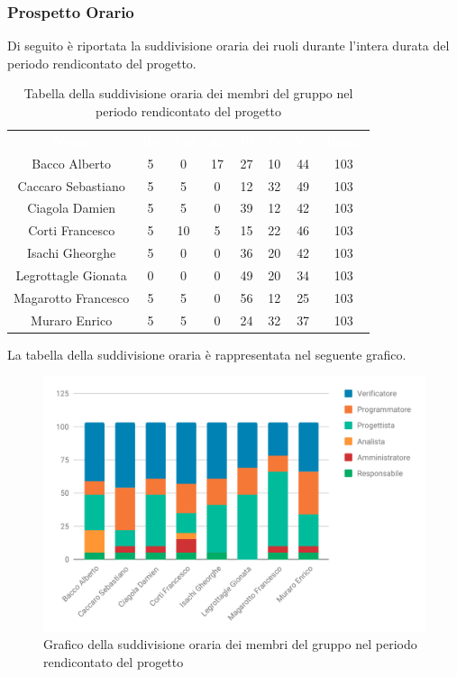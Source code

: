 \subsubsection{Prospetto Orario}
Di seguito è riportata la suddivisione oraria dei ruoli durante l'intera durata del periodo rendicontato del progetto.


\begin{table}[H]	
	\begin{center}
	    \begin{tabular}{cccccccc}
			\rowcolor{greySWEight}
			\textcolor{white}{\textbf{Nome}} & \textcolor{white}{\textbf{Re}} & \textcolor{white}{\textbf{Am}} & \textcolor{white}{\textbf{An}} & \textcolor{white}{\textbf{Pj}} & \textcolor{white}{\textbf{Pr}} & \textcolor{white}{\textbf{Ve}} & \textcolor{white}{\textbf{Totale}}
			\\			
			Bacco Alberto & 5 & 0 & 17 & 27 & 10 & 44 & 103 \\
			Caccaro Sebastiano & 5 & 5 & 0 & 12 & 32 & 49 & 103 \\
			Ciagola Damien & 5 & 5 & 0 & 39 & 12 & 42 & 103 \\
			Corti Francesco & 5 & 10 & 5 & 15 & 22 & 46 & 103 \\
			Isachi Gheorghe & 5 & 0 & 0 & 36 & 20 & 42 & 103 \\
			Legrottagle Gionata & 0 & 0 & 0 & 49 & 20 & 34 & 103 \\
			Magarotto Francesco & 5 & 5 & 0 & 56 & 12 & 25 & 103 \\
			Muraro Enrico & 5 & 5 & 0 & 24 & 32 & 37 & 103 \\
			\end{tabular}
	    \caption{Tabella della suddivisione oraria dei membri del gruppo nel periodo rendicontato del progetto} \label{tab:tabellaPersoneTotale} 
	\end{center}
\end{table}

La tabella della suddivisione oraria è rappresentata nel seguente grafico.
\begin{figure}[H]
	\includegraphics[width=1\linewidth]{Preventivo/grafici/TR1.pdf}
	\caption{Grafico della suddivisione oraria dei membri del gruppo nel periodo rendicontato del progetto}
\end{figure}

